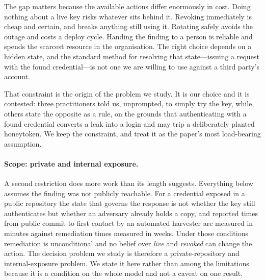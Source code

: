 \documentclass{article}
\begin{document}
The gap matters because the available actions differ enormously in cost. Doing
nothing about a live key risks whatever sits behind it. Revoking immediately is
cheap and certain, and breaks anything still using it. Rotating safely avoids
the outage and costs a deploy cycle. Handing the finding to a person is reliable
and spends the scarcest resource in the organisation. The right choice depends
on a hidden state, and the standard method for resolving that state---issuing a
request with the found credential---is not one we are willing to use against a
third party's account.

That constraint is the origin of the problem we study. It is our choice and it
is contested: three practitioners told us, unprompted, to simply try the key,
while others state the opposite as a rule, on the grounds that authenticating
with a found credential converts a leak into a login and may trip a
deliberately planted honeytoken. We keep the constraint, and treat it as the
paper's most load-bearing assumption.

\paragraph{Scope: private and internal exposure.} A second restriction does
more work than its length suggests. Everything below assumes the finding was
not publicly reachable. For a credential exposed in a public repository the
state that governs the response is not whether the key still authenticates but
whether an adversary already holds a copy, and reported times from public
commit to first contact by an automated harvester are measured in minutes
against remediation times measured in weeks. Under those conditions
remediation is unconditional and no belief over \emph{live} and \emph{revoked}
can change the action. The decision problem we study is therefore a
private-repository and internal-exposure problem. We state it here rather than
among the limitations because it is a condition on the whole model and not a
caveat on one result.
\end{document}
